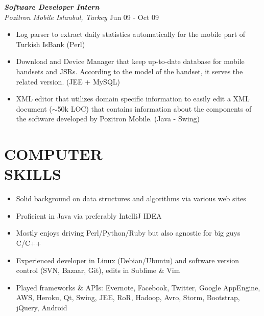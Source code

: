 \documentclass[line, margin]{res}
\begin{document}
\begin{resume}
				{\sl \textbf{Software Developer Intern} \\ Pozitron Mobile Istanbul, Turkey} \hfill Jun 09 - Oct 09\\
				\vspace{-0.3cm}
				\begin{itemize} \itemsep -2pt
					\item Log parser to extract daily statistics automatically for the mobile part of Turkish IsBank (Perl)
					\item Download and Device Manager that keep up-to-date database for mobile handsets  and JSRs. According to the model of the handset, it serves the related version. (JEE + MySQL)
					\item XML editor that utilizes domain specific information to easily edit a XML document ($\sim$50k LOC) that contains information about the components of the software developed by Pozitron Mobile. (Java - Swing)
				\end{itemize}

\section{COMPUTER \\ SKILLS} 
				\begin{itemize}
				\item Solid background on data structures and algorithms via various web sites
				\item Proficient in Java via preferably IntelliJ IDEA
				\item Mostly enjoys driving Perl/Python/Ruby but also agnostic for big guys C/C++
				\item Experienced developer in Linux (Debian/Ubuntu) and software version control (SVN, Bazaar, Git), edits in Sublime \& Vim
				\item Played frameworks \& APIs: Evernote, Facebook, Twitter, Google AppEngine, AWS, Heroku, Qt, Swing, JEE, RoR, Hadoop, Avro, Storm, Bootstrap, jQuery, Android
				\end{itemize}

\end{resume}
\end{document}

